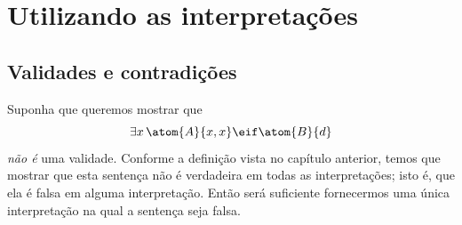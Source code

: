 \chapter{Utilizando as interpretações}
\label{sec.UsingModels}

\section{Validades e contradições}
Suponha que queremos mostrar que
$$\exists x\, \atom{A}{x,x} \eif \atom{B}{d}$$
\emph{não é} uma validade.
Conforme a definição vista no capítulo anterior, temos que mostrar que esta  sentença não é verdadeira em todas as interpretações; isto é, que ela é falsa em alguma interpretação.
Então será suficiente fornecermos uma única interpretação na qual a sentença seja falsa.

